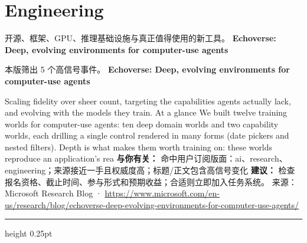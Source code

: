 \documentclass[10.5pt]{ctexart}
\begin{document}
\section*{Engineering}
{\color{ormuted} 开源、框架、GPU、推理基础设施与真正值得使用的新工具。}
\vspace{2mm}
{\LARGE\bfseries Echoverse: Deep, evolving environments for computer-use agents}\par
\vspace{1mm}
{\color{ormuted} 本版筛出 5 个高信号事件。}
\vspace{3mm}
{\Large\bfseries Echoverse: Deep, evolving environments for computer-use agents}\par
Scaling fidelity over sheer count, targeting the capabilities agents actually lack, and evolving with the models they train. At a glance We built twelve training worlds for computer-use agents: ten deep domain worlds and two capability worlds, each drilling a single control rendered in many forms (date pickers and nested filters). Depth is what makes them worth training on: these worlds reproduce an application’s rea
\textbf{与你有关：} 命中用户订阅版面：ai、research、engineering；来源接近一手且权威度高；标题/正文包含高信号变化
\textbf{建议：} 检查报名资格、截止时间、参与形式和预期收益；合适则立即加入任务系统。
{\footnotesize\color{ormuted} 来源：Microsoft Research Blog · \url{https://www.microsoft.com/en-us/research/blog/echoverse-deep-evolving-environments-for-computer-use-agents/}}
\vspace{4mm}
\hrule height 0.25pt
\vspace{3mm}
\end{document}
